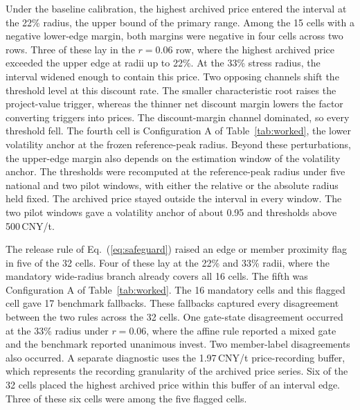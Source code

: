 Under the baseline calibration, the highest archived price entered the interval at the 22\% radius, the upper bound of the primary range. Among the 15 cells with a negative lower-edge margin, both margins were negative in four cells across two rows. Three of these lay in the $r=0.06$ row, where the highest archived price exceeded the upper edge at radii up to 22\%. At the 33\% stress radius, the interval widened enough to contain this price. Two opposing channels shift the threshold level at this discount rate. The smaller characteristic root raises the project-value trigger, whereas the thinner net discount margin lowers the factor converting triggers into prices. The discount-margin channel dominated, so every threshold fell. The fourth cell is Configuration A of Table~\ref{tab:worked}, the lower volatility anchor at the frozen reference-peak radius. Beyond these perturbations, the upper-edge margin also depends on the estimation window of the volatility anchor. The thresholds were recomputed at the reference-peak radius under five national and two pilot windows, with either the relative or the absolute radius held fixed. The archived price stayed outside the interval in every window. The two pilot windows gave a volatility anchor of about 0.95 and thresholds above 500\,CNY/t.

The release rule of Eq.~(\ref{eq:safeguard}) raised an edge or member proximity flag in five of the 32 cells. Four of these lay at the 22\% and 33\% radii, where the mandatory wide-radius branch already covers all 16 cells. The fifth was Configuration A of Table~\ref{tab:worked}. The 16 mandatory cells and this flagged cell gave 17 benchmark fallbacks. These fallbacks captured every disagreement between the two rules across the 32 cells. One gate-state disagreement occurred at the 33\% radius under $r=0.06$, where the affine rule reported a mixed gate and the benchmark reported unanimous invest. Two member-label disagreements also occurred. A separate diagnostic uses the 1.97\,CNY/t price-recording buffer, which represents the recording granularity of the archived price series. Six of the 32 cells placed the highest archived price within this buffer of an interval edge. Three of these six cells were among the five flagged cells.


